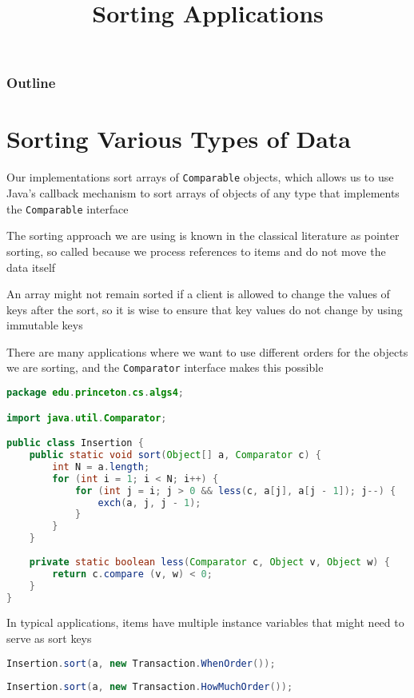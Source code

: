 \documentclass[8pt,a4paper,compress]{beamer}
\title{Sorting Applications}
\date{}
\begin{document}
\begin{frame}
\vfill
\titlepage
\end{frame}

\begin{frame}
\frametitle{Outline}
\tableofcontents
\end{frame}

\section{Sorting Various Types of Data}
\begin{frame}[fragile]
\pause

Our implementations sort arrays of \lstinline$Comparable$ objects, which allows us to use Java's callback mechanism to sort arrays of objects of any type that implements the \lstinline$Comparable$ interface

\pause
\bigskip

The sorting approach we are using is known in the classical literature as pointer sorting, so called because we process references to items and do not move the data itself

\pause
\bigskip

An array might not remain sorted if a client is allowed to change the values of keys after the sort, so it is wise to ensure that key values do not change by using immutable keys
\end{frame}

\begin{frame}[fragile]
\pause

There are many applications where we want to use different orders for the objects we are sorting, and the \lstinline$Comparator$ interface makes this possible

\begin{lstlisting}[language=Java]
package edu.princeton.cs.algs4;

import java.util.Comparator;

public class Insertion {
    public static void sort(Object[] a, Comparator c) {
        int N = a.length;
        for (int i = 1; i < N; i++) {
            for (int j = i; j > 0 && less(c, a[j], a[j - 1]); j--) {
                exch(a, j, j - 1);
            }
        }
    }
    
    private static boolean less(Comparator c, Object v, Object w) {     
        return c.compare (v, w) < 0; 
    }
}
\end{lstlisting}

\pause
\bigskip

In typical applications, items have multiple instance variables that might need to serve as sort keys
\begin{lstlisting}[language=Java]
Insertion.sort(a, new Transaction.WhenOrder());
\end{lstlisting}

\begin{lstlisting}[language=Java]
Insertion.sort(a, new Transaction.HowMuchOrder());
\end{lstlisting}
\end{frame}
\end{document}
